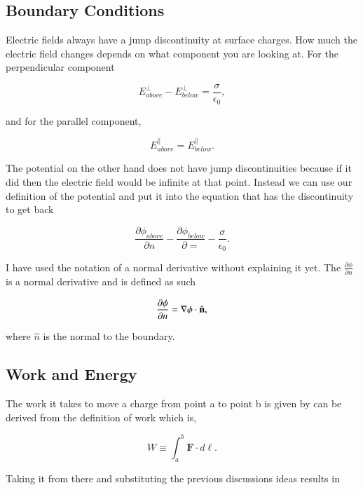 \documentclass[preprint, review,12pt]{elsarticle}
\def\.{\cdot}
\def\b{\textbf}
\def\bell{\bm{\ell}}
\def\={\equiv}
\newcommand{\pd}[2]{\frac{\partial #1 }{\partial #2}}
\newcommand{\hb}[1]{\hat{\b #1}}
\begin{document}
\subsection{Boundary Conditions}

Electric fields always have a jump discontinuity at surface charges. How much the electric field changes depends on what component you are looking at. For the perpendicular component

\begin{equation}
    E_{above}^\bot - E_{below}^\bot = \frac{\sigma}{\epsilon_0},
\end{equation}

and for the parallel component,

\begin{equation}
    E_{above}^\parallel = E_{below}^\parallel.
\end{equation}

The potential on the other hand does not have jump discontinuities because if it did then the electric field would be infinite at that point. Instead we can use our definition of the potential and put it into the equation that has the discontinuity to get back

\begin{equation}
    \pd{\phi_{above}}{n} - \pd{\phi_{below}} = -\frac{\sigma}{\epsilon_0}.
\end{equation}

I have used the notation of a normal derivative without explaining it yet. The $\frac{\partial \phi}{\partial n}$ is a normal derivative and is defined as such

\begin{equation}
    \pd{\phi}{n} = \nabla \phi \. \hb{n},
\end{equation}

where $\hat{n}$ is the normal to the boundary. 


\subsection{Work and Energy}

The work it takes to move a charge from point a to point b is given by can be derived from the definition of work which is,

\begin{equation}
    W \= \int_a^b \b{F}\. d\bell.
\end{equation}

Taking it from there and substituting the previous discussions ideas results in
\end{document}
